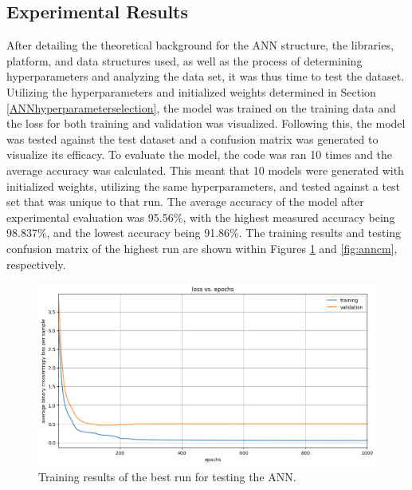\documentclass[a4paper]{article}
\begin{document}
\subsection{Experimental Results}

After detailing the theoretical background for the ANN structure, the libraries, platform, and data structures used, as well as the process of determining hyperparameters and analyzing the data set, it was thus time to test the dataset. Utilizing the hyperparameters and initialized weights determined in Section \ref{ANNhyperparameterselection}, the model was trained on the training data and the loss for both training and validation was visualized. Following this, the model was tested against the test dataset and a confusion matrix was generated to visualize its efficacy. To evaluate the model, the code was ran 10 times and the average accuracy was calculated. This meant that 10 models were generated with initialized weights, utilizing the same hyperparameters, and tested against a test set that was unique to that run. The average accuracy of the model after experimental evaluation was 95.56\%, with the highest measured accuracy being 98.837\%, and the lowest accuracy being 91.86\%. The training results and testing confusion matrix of the highest run are shown within Figures \ref{fig:anntrain} and \ref{fig:anncm}, respectively. 

\begin{figure}[h]
    \centering
    \includegraphics[width=0.9\linewidth]{images/ANNtrain.png}
    \caption{Training results of the best run for testing the ANN.}
    \label{fig:anntrain}
\end{figure}
\end{document}
